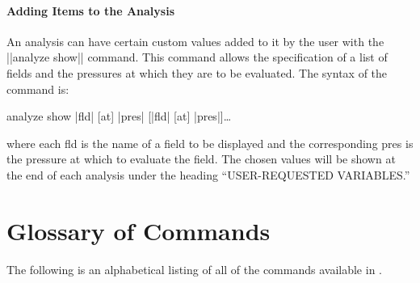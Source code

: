 \subsection{Adding Items to the Analysis}
An analysis can have certain custom values added to it by the user with
the ||analyze show|| command.  This command allows the specification of
a list of fields and the pressures at which they are to be evaluated. The
syntax of the command is:
\begin{example}
	analyze show |fld| [at] |pres| [|fld| [at] |pres|]\ldots
\end{example}
where each {\pf fld} is the name of a field to be displayed and the 
corresponding {\pf pres} is the pressure at which to evaluate the field.
The chosen values will be shown at the end of each analysis under the heading
``USER-REQUESTED VARIABLES.''


\part{Glossary of Commands}
The following is an alphabetical listing of all of the commands available
in \suds.

